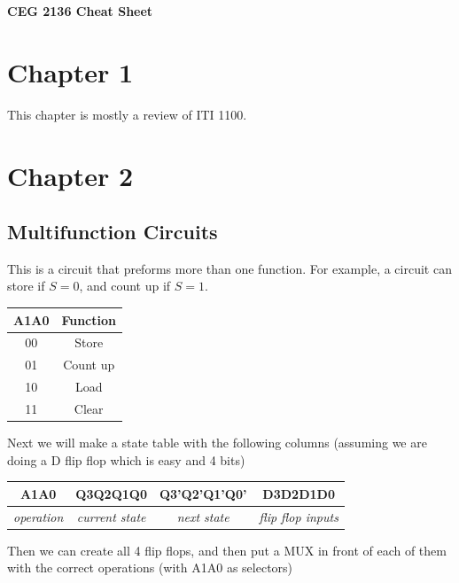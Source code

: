 \documentclass[12pt,letterpaper]{article} \usepackage{amsmath} \usepackage{graphicx} \usepackage[margin=1in]{geometry} \usepackage{longtable}  \usepackage{amssymb}
\begin{document}
	
	\begin{center}
		\Large\textbf{CEG 2136 Cheat Sheet} \\
		\vspace{0.5em}
	\end{center}
	
		\section{Chapter 1}
		
		This chapter is mostly a review of ITI 1100.
		
		
		\section{Chapter 2}
		
		\subsection{Multifunction Circuits}
		This is a circuit that preforms more than one function. For example, a circuit can store if $S=0$, and count up if $S=1$.
		
		\begin{center}
			\begin{tabular}{|c|c|}
				\hline
				A1A0 & Function \\
				\hline
				00 & Store \\
				\hline
				01 & Count up \\
				\hline
				10 & Load \\
				\hline
				11 & Clear \\
				\hline
			\end{tabular}
		\end{center}
	
		Next we will make a state table with the following columns (assuming we are doing a D flip flop which is easy and 4 bits)
		
		\begin{center}
			\begin{tabular}{|c|c|c|c|}
				\hline
				A1A0 & Q3Q2Q1Q0 & Q3'Q2'Q1'Q0' & D3D2D1D0 \\
				\hline
				\textit{operation} & \textit{current state} & \textit{next state} & \textit{flip flop inputs} \\
				\hline
			\end{tabular}
		\end{center}
	
		Then we can create all 4 flip flops, and then put a MUX in front of each of them with the correct operations (with A1A0 as selectors)
		
\end{document}
